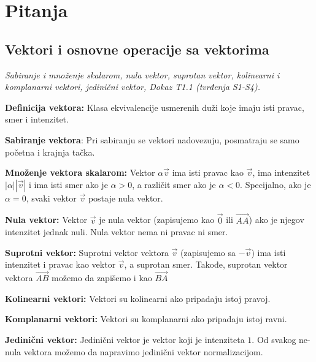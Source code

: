 \documentclass[12pt]{article}
\newcommand{\vek}[1]{\overrightarrow{#1}}
\begin{document}
\newpage

\section{Pitanja}
\subsection{Vektori i osnovne operacije sa vektorima}
\textit{Sabiranje i množenje skalarom, nula vektor, suprotan vektor, kolinearni
    i komplanarni vektori, jedinični vektor, Dokaz T1.1 (tvrđenja S1-S4).}
\par
\vspace*{1cm}

\textbf{Definicija vektora:} Klasa ekvivalencije usmerenih duži koje imaju isti
pravac, smer i intenzitet.
\par

\textbf{Sabiranje vektora}: Pri sabiranju se vektori nadovezuju, posmatraju se
samo početna i krajnja tačka.
\par

\textbf{Množenje vektora skalarom:} Vektor $\alpha\vek{v}$ ima isti pravac
kao $\vek{v}$, ima intenzitet $|\alpha||\vek{v}|$ i ima isti smer ako je
$\alpha>0$, a različit smer ako je $\alpha<0$. Specijalno, ako je $\alpha=0$,
svaki vektor $\vek{v}$ postaje nula vektor.
\par

\textbf{Nula vektor:} Vektor $\vek{v}$ je nula vektor (zapisujemo kao $\vek{0}$
ili $\vek{AA}$) ako je njegov intenzitet jednak nuli. Nula vektor nema ni
pravac ni smer.
\par

\textbf{Suprotni vektor:} Suprotni vektor vektora $\vek{v}$ (zapisujemo sa
$-\vek{v}$) ima isti intenzitet i pravac kao vektor $\vek{v}$, a suprotan smer.
Takođe, suprotan vektor vektora $\vek{AB}$ možemo da zapišemo i kao $\vek{BA}$
\par

\textbf{Kolinearni vektori:} Vektori su kolinearni ako pripadaju istoj pravoj.
\par

\textbf{Komplanarni vektori:} Vektori su komplanarni ako pripadaju istoj ravni.
\par

\textbf{Jedinični vektor:} Jedinični vektor je vektor koji je intenziteta $1$.
Od svakog ne-nula vektora možemo da napravimo jedinični vektor normalizacijom.
\par
\end{document}
